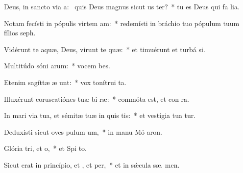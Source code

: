 \item Deus, in sancto via a:~\pscross{} quis Deus magnus sicut us ter?~* tu es Deus qui fa lia.
\item Notam fecísti in pópulis virtem am:~* redemísti in bráchio tuo pópulum tuum fílios   seph.
\item Vidérunt te aquæ, Deus, virunt te quæ:~* et timuérunt et turbá  si.
\item Multitúdo sóni arum:~* vocem  bes.
\item Etenim sagíttæ æ unt:~* vox tonítrui   ta.
\item Illuxérunt coruscatiónes tuæ bi ræ:~* commóta est, et con ra.
\item In mari via tua, et sémitæ tuæ in quis tis:~* et vestígia tua  tur.
\item Deduxísti sicut oves pulum um,~* in manu Mó  aron.
\item Glória tri, et o,~* et Spi to.
\item Sicut erat in princípio, et , et per,~* et in sǽcula sæ. men.
